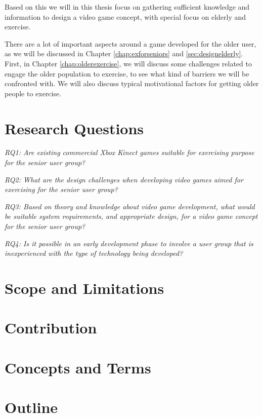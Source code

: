 Based on this we will in this thesis focus on gathering sufficient knowledge and information to design a video game concept, with special focus on elderly and exercise.    

There are a lot of important aspects around a game developed for the older user, as we will be discussed in Chapter \ref{chap:exforseniors} and \ref{sec:designelderly}. First, in Chapter \ref{chap:olderexercise}, we will discuss some challenges related to engage the older population to exercise, to see what kind of barriers we will be confronted with. We will also discuss typical motivational factors for getting older people to exercise.  

\section{Research Questions}
\label{sec:researchq}

\emph{RQ1: Are existing commercial Xbox Kinect games suitable for exercising purpose for the senior user group?} 

\emph{RQ2: What are the design challenges when developing video games aimed for exercising for the senior user group?} 

\emph{RQ3: Based on theory and knowledge about video game development, what would be suitable system requirements, and appropriate design, for a video game concept for the senior user group?}

\emph{RQ4: Is it possible in an early development phase to involve a user group that is inexperienced with the type of technology being developed?}


\section{Scope and Limitations}

\section{Contribution}

\section{Concepts and Terms}

\section{Outline}